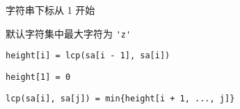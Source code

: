 字符串下标从 1 开始

默认字符集中最大字符为 \verb|'z'|

\verb|height[i] = lcp(sa[i - 1], sa[i])|

\verb|height[1] = 0|

\verb|lcp(sa[i], sa[j]) = min{height[i + 1, ..., j]}|